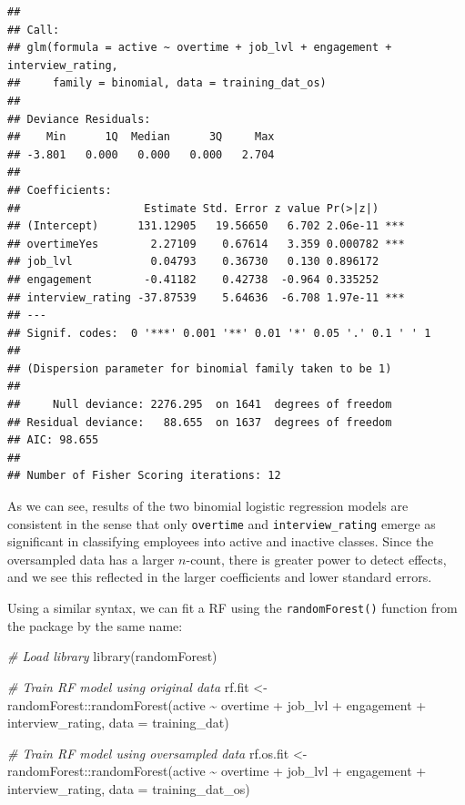 \documentclass[
]{book}
\newenvironment{Shaded}{\begin{snugshade}}{\end{snugshade}}
\newcommand{\AttributeTok}[1]{\textcolor[rgb]{0.77,0.63,0.00}{#1}}
\newcommand{\CommentTok}[1]{\textcolor[rgb]{0.56,0.35,0.01}{\textit{#1}}}
\newcommand{\FunctionTok}[1]{\textcolor[rgb]{0.00,0.00,0.00}{#1}}
\newcommand{\NormalTok}[1]{#1}
\newcommand{\OtherTok}[1]{\textcolor[rgb]{0.56,0.35,0.01}{#1}}
\newcommand{\SpecialCharTok}[1]{\textcolor[rgb]{0.00,0.00,0.00}{#1}}
\begin{document}
\begin{verbatim}
## 
## Call:
## glm(formula = active ~ overtime + job_lvl + engagement + interview_rating, 
##     family = binomial, data = training_dat_os)
## 
## Deviance Residuals: 
##    Min      1Q  Median      3Q     Max  
## -3.801   0.000   0.000   0.000   2.704  
## 
## Coefficients:
##                   Estimate Std. Error z value Pr(>|z|)    
## (Intercept)      131.12905   19.56650   6.702 2.06e-11 ***
## overtimeYes        2.27109    0.67614   3.359 0.000782 ***
## job_lvl            0.04793    0.36730   0.130 0.896172    
## engagement        -0.41182    0.42738  -0.964 0.335252    
## interview_rating -37.87539    5.64636  -6.708 1.97e-11 ***
## ---
## Signif. codes:  0 '***' 0.001 '**' 0.01 '*' 0.05 '.' 0.1 ' ' 1
## 
## (Dispersion parameter for binomial family taken to be 1)
## 
##     Null deviance: 2276.295  on 1641  degrees of freedom
## Residual deviance:   88.655  on 1637  degrees of freedom
## AIC: 98.655
## 
## Number of Fisher Scoring iterations: 12
\end{verbatim}

As we can see, results of the two binomial logistic regression models are consistent in the sense that only \texttt{overtime} and \texttt{interview\_rating} emerge as significant in classifying employees into active and inactive classes. Since the oversampled data has a larger \(n\)-count, there is greater power to detect effects, and we see this reflected in the larger coefficients and lower standard errors.

Using a similar syntax, we can fit a RF using the \texttt{randomForest()} function from the package by the same name:

\begin{Shaded}
\begin{Highlighting}[]
\CommentTok{\# Load library}
\FunctionTok{library}\NormalTok{(randomForest)}

\CommentTok{\# Train RF model using original data}
\NormalTok{rf.fit }\OtherTok{\textless{}{-}}\NormalTok{ randomForest}\SpecialCharTok{::}\FunctionTok{randomForest}\NormalTok{(active }\SpecialCharTok{\textasciitilde{}}\NormalTok{ overtime }\SpecialCharTok{+}\NormalTok{ job\_lvl }\SpecialCharTok{+}\NormalTok{ engagement }\SpecialCharTok{+}\NormalTok{ interview\_rating, }\AttributeTok{data =}\NormalTok{ training\_dat)}

\CommentTok{\# Train RF model using oversampled data}
\NormalTok{rf.os.fit }\OtherTok{\textless{}{-}}\NormalTok{ randomForest}\SpecialCharTok{::}\FunctionTok{randomForest}\NormalTok{(active }\SpecialCharTok{\textasciitilde{}}\NormalTok{ overtime }\SpecialCharTok{+}\NormalTok{ job\_lvl }\SpecialCharTok{+}\NormalTok{ engagement }\SpecialCharTok{+}\NormalTok{ interview\_rating, }\AttributeTok{data =}\NormalTok{ training\_dat\_os)}
\end{Highlighting}
\end{Shaded}
\end{document}
